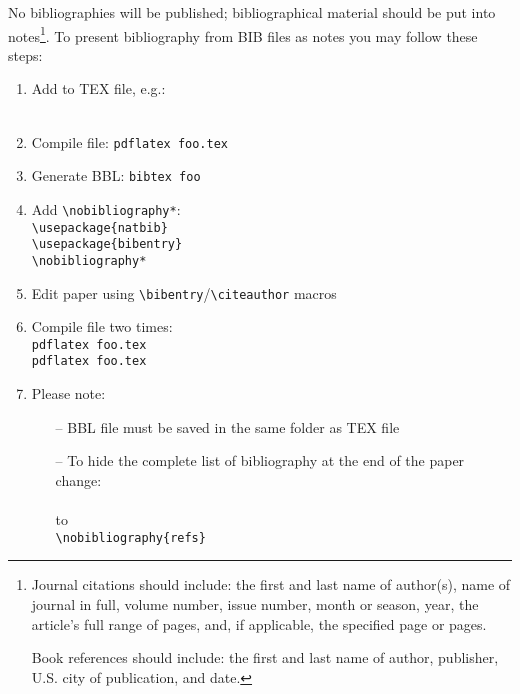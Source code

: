 \documentclass{jphilart}
\begin{document}
No bibliographies will be published; bibliographical
material should be put into notes\footnote{Journal citations should include:
the first and last name of author(s), name of journal in full, volume number,
issue number, month or season, year, the article's full range of pages, and,
if applicable, the specified page or pages.

Book references should include: the first and last name of author,
publisher, U.S. city of publication, and date.}.
To present bibliography from BIB files as notes you may follow
these steps: 
\begin{enumerate}
  \item Add \verb++ to TEX file, e.g.:\\
    \verb++\\
    \verb++

  \item Compile file: \texttt{pdflatex foo.tex}

  \item Generate BBL: \texttt{bibtex foo}

  \item Add \verb+\nobibliography*+:\\
    \verb+\usepackage{natbib}+\\
    \verb+\usepackage{bibentry}+\\
    \verb+\nobibliography*+

  \item Edit paper using \verb+\bibentry+/\verb+\citeauthor+ macros

  \item Compile file two times:\\
    \texttt{pdflatex foo.tex}\\
    \texttt{pdflatex foo.tex}

  \item Please note:
  \begin{itemize}
    \item[--] BBL file must be saved in the same folder as TEX file
    \item[--] To hide the complete list of bibliography at the end of the paper change:\\
      \verb++\\
    to\\
      \verb+\nobibliography{refs}+
  \end{itemize}
\end{enumerate}

\end{document}
